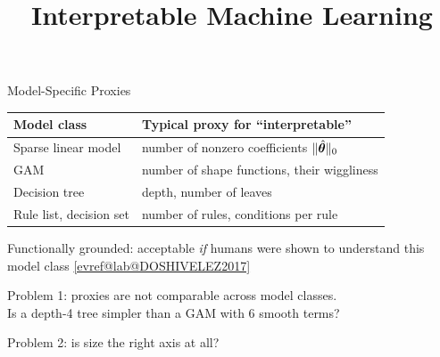 \documentclass[10pt,compress,t,notes=noshow, xcolor=table]{beamer}
\title{Interpretable Machine Learning}
\makeatletter
\newcommand{\citeref}[1]{%
  \href{\csname evref@url@#1\endcsname}{[\csname evref@lab@#1\endcsname]}}
\makeatother
\begin{document}





\begin{framev}[align=mid]{Model-Specific Proxies}
\centering\small
\renewcommand{\arraystretch}{1.3}
\begin{tabular}{@{}ll@{}}
\toprule
Model class & Typical proxy for ``interpretable'' \\
\midrule
Sparse linear model & number of nonzero coefficients $\|\hat{\bm{\theta}}\|_0$ \\
GAM & number of shape functions, their wiggliness \\
Decision tree & depth, number of leaves \\
Rule list, decision set & number of rules, conditions per rule \\
\bottomrule
\end{tabular}
\spacer[0.8]
\raggedright
\begin{itemizeM}
\item Functionally grounded: acceptable \emph{if} humans were shown to understand this model class \citeref{DOSHIVELEZ2017}
\item Problem 1: proxies are not comparable across model classes.\\ Is a depth-4 tree simpler than a GAM with 6 smooth terms?
\item Problem 2: is size the right axis at all? 
\end{itemizeM}
\end{framev}
\end{document}
